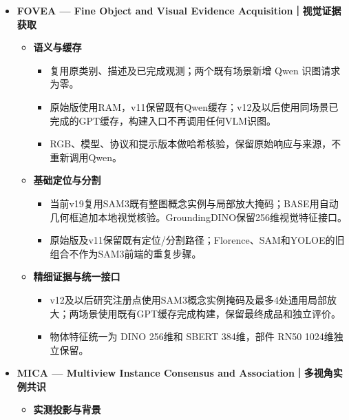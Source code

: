 \documentclass[UTF8,fontset=fandol]{ctexart}
\begin{document}
\begin{itemize}
\item \textbf{FOVEA — Fine Object and Visual Evidence Acquisition｜视觉证据获取}


\begin{itemize}
\item \textbf{语义与缓存}


\begin{itemize}
\item 复用原类别、描述及已完成观测；两个既有场景新增 Qwen 识图请求为零。


\item 原始版使用RAM，v11保留既有Qwen缓存；v12及以后使用同场景已完成的GPT缓存，构建入口不再调用任何VLM识图。


\item RGB、模型、协议和提示版本做哈希核验，保留原始响应与来源，不重新调用Qwen。

\end{itemize}

\item \textbf{基础定位与分割}


\begin{itemize}
\item 当前v19复用SAM3既有整图概念实例与局部放大掩码；BASE用自动几何框追加本地视觉核验。GroundingDINO保留256维视觉特征接口。


\item 原始版及v11保留既有定位/分割路径；Florence、SAM和YOLOE的旧组合不作为SAM3前端的重复步骤。

\end{itemize}

\item \textbf{精细证据与统一接口}


\begin{itemize}
\item v12及以后研究注册点使用SAM3概念实例掩码及最多4处通用局部放大；两场景使用既有GPT缓存完成构建，保留最终成品和独立评价。


\item 物体特征统一为 DINO 256维和 SBERT 384维，部件 RN50 1024维独立保留。

\end{itemize}
\end{itemize}

\item \textbf{MICA — Multiview Instance Consensus and Association｜多视角实例共识}


\begin{itemize}
\item \textbf{实测投影与背景}



\end{itemize}
\end{itemize}
\end{document}
